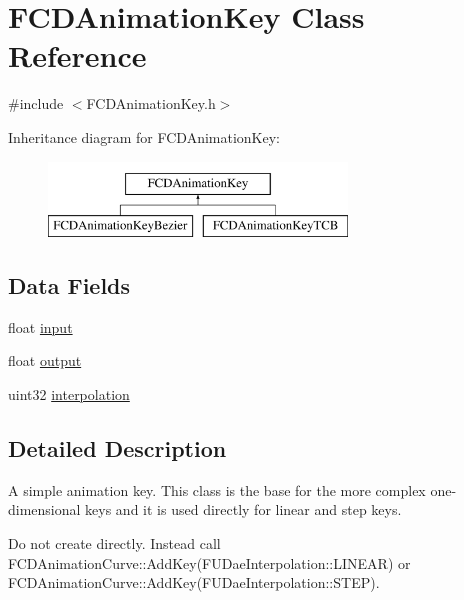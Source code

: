 \hypertarget{classFCDAnimationKey}{
\section{FCDAnimationKey Class Reference}
\label{classFCDAnimationKey}
}


{\ttfamily \#include $<$FCDAnimationKey.h$>$}

Inheritance diagram for FCDAnimationKey:\begin{figure}[H]
\begin{center}
\leavevmode
\includegraphics[height=2.000000cm]{classFCDAnimationKey}
\end{center}
\end{figure}
\subsection*{Data Fields}
\begin{DoxyCompactItemize}
\item 
float \hyperlink{classFCDAnimationKey_a1591f4d28aac7dff40d92b0308809a7f}{input}
\item 
float \hyperlink{classFCDAnimationKey_aa779e0e946f47dbc9a2d6b9eeb58d6c2}{output}
\item 
uint32 \hyperlink{classFCDAnimationKey_a09ea6034885bc7a3c8af91afa68a52ed}{interpolation}
\end{DoxyCompactItemize}


\subsection{Detailed Description}
A simple animation key. This class is the base for the more complex one-\/dimensional keys and it is used directly for linear and step keys.

Do not create directly. Instead call FCDAnimationCurve::AddKey(FUDaeInterpolation::LINEAR) or FCDAnimationCurve::AddKey(FUDaeInterpolation::STEP). 


